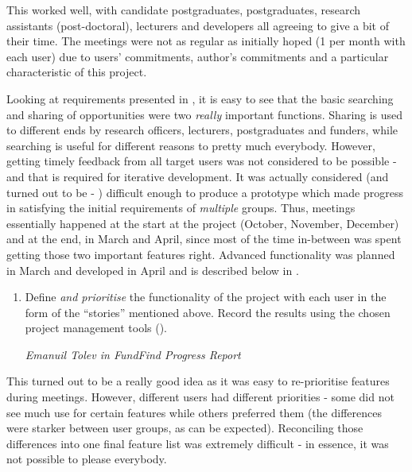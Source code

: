This worked well, with candidate postgraduates, postgraduates, research assistants (post-doctoral), lecturers and developers all agreeing to give a bit of their time. The meetings were not as regular as initially hoped (1 per month with each user) due to users' commitments, author's commitments and a particular characteristic of this project.

Looking at requirements presented in , it is easy to see that the basic searching and sharing of opportunities were two \emph{really} important functions. Sharing is used to different ends by research officers, lecturers, postgraduates and funders, while searching is useful for different reasons to pretty much everybody. However, getting timely feedback from all target users was not considered to be possible - and that is required for iterative development. It was actually considered (and turned out to be - ) difficult enough to produce a prototype which made progress in satisfying the initial requirements of \emph{multiple} groups. Thus, meetings essentially happened at the start at the project (October, November, December) and at the end, in March and April, since most of the time in-between was spent getting those two important features right. Advanced functionality was planned in March and developed in April and is described below in .

\begin{shadequote}
\begin{enumerate}
	\setcounter{enumi}{\thetmpc}
	\item Define \emph{and prioritise} the functionality of the project with each user in the form of the ``stories'' mentioned above. Record the results using the chosen project management tools ().
	\par\emph{Emanuil Tolev in FundFind Progress Report \cite{progress-report}}
	\setcounter{tmpc}{\theenumi}
\end{enumerate}
\end{shadequote}

This turned out to be a really good idea as it was easy to re-prioritise features during meetings. However, different users had different priorities - some did not see much use for certain features while others preferred them (the differences were starker between user groups, as can be expected). Reconciling those differences into one final feature list was extremely difficult - in essence, it was not possible to please everybody.

